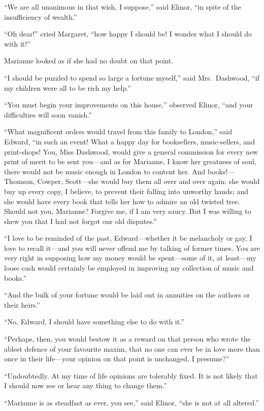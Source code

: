 ``We are all unanimous in that wish, I suppose,''
said Elinor, ``in spite of the insufficiency of wealth.''

``Oh dear!'' cried Margaret, ``how happy I should be!
I wonder what I should do with it!''

Marianne looked as if she had no doubt on that point.

``I should be puzzled to spend so large a fortune myself,''
said Mrs.\ Dashwood, ``if my children were all to be rich
my help.''

``You must begin your improvements on this house,''
observed Elinor, ``and your difficulties will soon vanish.''

``What magnificent orders would travel from this family
to London,'' said Edward, ``in such an event!  What a happy
day for booksellers, music-sellers, and print-shops!  You,
Miss Dashwood, would give a general commission for every
new print of merit to be sent you---and as for Marianne,
I know her greatness of soul, there would not be music enough
in London to content her.  And books!---Thomson, Cowper,
Scott---she would buy them all over and over again: she
would buy up every copy, I believe, to prevent their
falling into unworthy hands; and she would have every
book that tells her how to admire an old twisted tree.
Should not you, Marianne?  Forgive me, if I am very saucy.
But I was willing to shew you that I had not forgot our
old disputes.''

``I love to be reminded of the past, Edward---whether it
be melancholy or gay, I love to recall it---and you
will never offend me by talking of former times.
You are very right in supposing how my money would be
spent---some of it, at least---my loose cash would certainly
be employed in improving my collection of music and books.''

``And the bulk of your fortune would be laid out
in annuities on the authors or their heirs.''

``No, Edward, I should have something else to do
with it.''

``Perhaps, then, you would bestow it as a reward on that
person who wrote the ablest defence of your favourite maxim,
that no one can ever be in love more than once in their
life---your opinion on that point is unchanged, I presume?''

``Undoubtedly. At my time of life opinions are tolerably fixed.
It is not likely that I should now see or hear any thing to
change them.''

``Marianne is as steadfast as ever, you see,'' said Elinor,
``she is not at all altered.''

